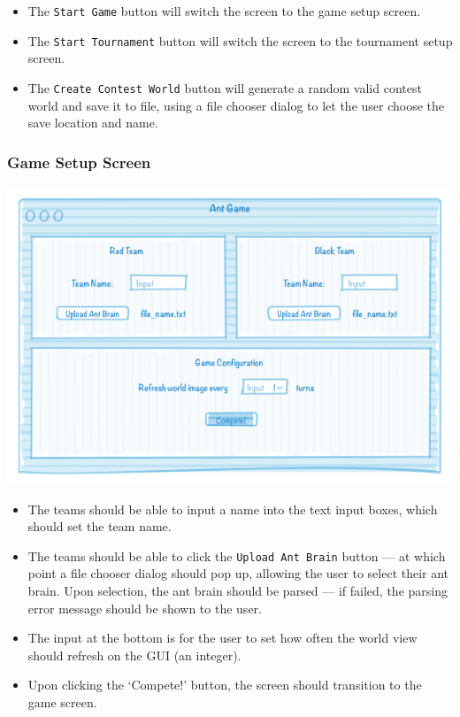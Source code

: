 \documentclass[11pt]{article}
\begin{document}
\begin{itemize}
\item The \texttt{Start Game} button will switch the screen to the game setup screen.
\item The \texttt{Start Tournament} button will switch the screen to the tournament setup screen.
\item The \texttt{Create Contest World} button will generate a random valid contest world and save it to file, using a file chooser dialog to let the user choose the save location and name.
\end{itemize}

\subsubsection{Game Setup Screen}

\begin{center}
\includegraphics[width=\textwidth]{low-level-diagrams/interface/game-setup-screen}
\end{center}

\begin{itemize}
\item The teams should be able to input a name into the text input boxes, which should set the team name.
\item The teams should be able to click the \texttt{Upload Ant Brain} button --- at which point a file chooser dialog should pop up, allowing the user to select their ant brain. Upon selection, the ant brain should be parsed --- if failed, the parsing error message should be shown to the user.
\item The input at the bottom is for the user to set how often the world view should refresh on the GUI (an integer).
\item Upon clicking the `Compete!' button, the screen should transition to the game screen. 
\end{itemize}
\end{document}
